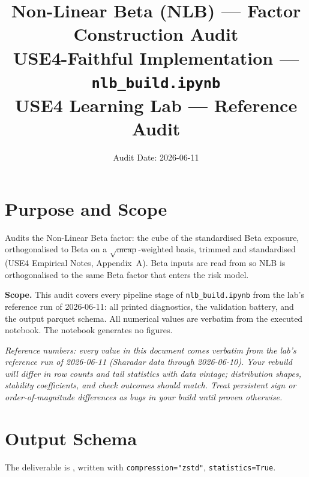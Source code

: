 \documentclass[11pt,a4paper]{article}
\title{\textbf{Non-Linear Beta (NLB) --- Factor Construction Audit}\\[2pt]
\large USE4-Faithful Implementation --- \texttt{nlb\_build.ipynb}\\[4pt]
\normalsize USE4 Learning Lab --- Reference Audit}
\author{Audit Date: 2026-06-11}
\date{}
\newcommand{\NOTE}[1]{\textcolor{note}{\textit{#1}}}
\begin{document}
\maketitle
\tableofcontents
\newpage

\section{Purpose and Scope}

Audits the Non-Linear Beta factor: the cube of the standardised
Beta exposure, orthogonalised to Beta on a $\sqrt{\text{mcap}}$-weighted basis,
trimmed and standardised (USE4 Empirical Notes, Appendix~A). Beta inputs are read
from  so NLB is orthogonalised to the same Beta factor
that enters the risk model.

\smallskip
\textbf{Scope.} This audit covers every pipeline stage of
\texttt{nlb\_build.ipynb} from the lab's reference run of 2026-06-11: all printed diagnostics, the
validation battery, and the output parquet schema. All numerical values are
verbatim from the executed notebook. The notebook generates no figures.

\NOTE{Reference numbers: every value in this document comes verbatim from the lab's reference run of 2026-06-11 (Sharadar data through 2026-06-10). Your rebuild will differ in row counts and tail statistics with data vintage; distribution shapes, stability coefficients, and check outcomes should match. Treat persistent sign or order-of-magnitude differences as bugs in your build until proven otherwise.}


\section{Output Schema}

The deliverable is , written with
\texttt{compression="zstd"}, \newline\texttt{statistics=True}.
\end{document}
